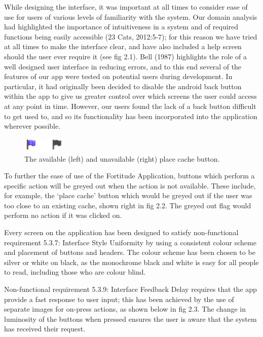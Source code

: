 While designing the interface, it was important at all times to consider ease of use for users of various levels of familiarity with the system. Our domain analysis had highlighted the importance of intuitiveness in a system and of required functions being easily accessible (23 Cats, 2012:5-7); for this reason we have tried at all times to make the interface clear, and have also included a help screen should the user ever require it (see fig 2.1). Bell (1987) highlights the role of a well designed user interface in reducing errors, and to this end several of the features of our app were tested on potential users during development. In particular, it had originally been decided to disable the android back button within the app to give us greater control over which screens the user could access at any point in time. However, our users found the lack of a back button difficult to get used to, and so its functionality has been incorporated into the application wherever possible.

\begin{figure}
	\vspace{-25pt}
	\begin{center}
	\includegraphics[width=0.18\textwidth]{images/flags_greye}
	\caption{The available (left) and unavailable (right) place cache button.}
	\label{flags_greye}
	\end{center}
	\vspace{-10pt}
\end{figure}

To further the ease of use of the Fortitude Application, buttons which perform a specific action will be greyed out when the action is not available. These include, for example, the ‘place cache’ button which would be greyed out if the user was too close to an existing cache, shown right in fig 2.2. The greyed out flag would perform no action if it was clicked on.

Every screen on the application has been designed to satisfy non-functional requirement 5.3.7: Interface Style Uniformity by using a consistent colour scheme and placement of buttons and headers. The colour scheme has been chosen to be silver or white on black, as the monochrome black and white is easy for all people to read, including those who are colour blind.

Non-functional requirement 5.3.9: Interface Feedback Delay requires that the app provide a fast response to user input; this has been achieved by the use of separate images for on-press actions, as shown below in fig 2.3. The change in luminosity of the buttons when pressed ensures the user is aware that the system has received their request.

